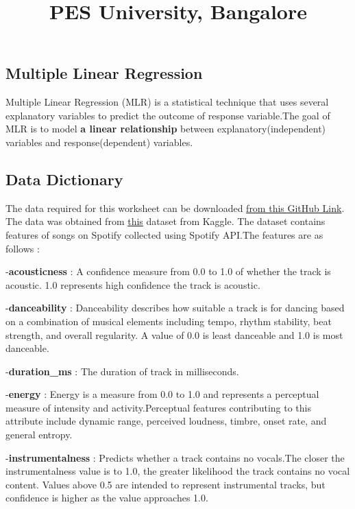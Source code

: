 \documentclass[
]{article}
\title{PES University, Bangalore}
\subtitle{\textbf{UE20CS312 - Data Analytics}

\textbf{Worksheet 2b : Multiple Linear Regression}

Course Anchor : Dr.~Gowri Srinivasa

Prepared by : Nishanth M S -
\href{mailto:nishanthmsathish.23@gmail.com}{\nolinkurl{nishanthmsathish.23@gmail.com}}}
\author{}
\date{\vspace{-2.5em}}
\begin{document}
\maketitle

\hypertarget{multiple-linear-regression}{%
\subsection{Multiple Linear
Regression}\label{multiple-linear-regression}}

Multiple Linear Regression (MLR) is a statistical technique that uses
several explanatory variables to predict the outcome of response
variable.The goal of MLR is to model \textbf{a linear relationship}
between explanatory(independent) variables and response(dependent)
variables.

\hypertarget{data-dictionary}{%
\subsection{Data Dictionary}\label{data-dictionary}}

The data required for this worksheet can be downloaded
\href{https://github.com/Data-Analytics-UE20CS312/Unit-2-Worksheets/tree/main/2b\%20-\%20Multi\%20Linear\%20Regression}{from
this GitHub Link}. The data was obtained from
\href{https://www.kaggle.com/datasets/bricevergnou/spotify-recommendation}{this}
dataset from Kaggle. The dataset contains features of songs on Spotify
collected using Spotify API.The features are as follows :

-\textbf{acousticness} : A confidence measure from 0.0 to 1.0 of whether
the track is acoustic. 1.0 represents high confidence the track is
acoustic.

-\textbf{danceability} : Danceability describes how suitable a track is
for dancing based on a combination of musical elements including tempo,
rhythm stability, beat strength, and overall regularity. A value of 0.0
is least danceable and 1.0 is most danceable.

-\textbf{duration\_ms} : The duration of track in milliseconds.

-\textbf{energy} : Energy is a measure from 0.0 to 1.0 and represents a
perceptual measure of intensity and activity.Perceptual features
contributing to this attribute include dynamic range, perceived
loudness, timbre, onset rate, and general entropy.

-\textbf{instrumentalness} : Predicts whether a track contains no
vocals.The closer the instrumentalness value is to 1.0, the greater
likelihood the track contains no vocal content. Values above 0.5 are
intended to represent instrumental tracks, but confidence is higher as
the value approaches 1.0.
\end{document}
